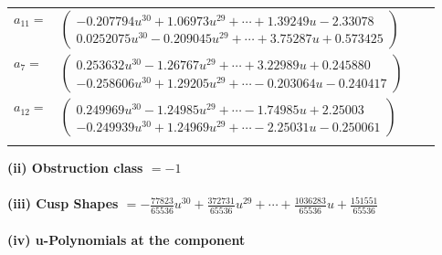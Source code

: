 \documentclass[1p]{elsarticle_modified}
\theoremstyle{definition}
\begin{document}
\begin{tabular}{m{7pt} m{180pt} m{7pt} m{180pt} }
\flushright $a_{11}=$&$\begin{pmatrix}-0.207794 u^{30}+1.06973 u^{29}+\cdots+1.39249 u-2.33078\\0.0252075 u^{30}-0.209045 u^{29}+\cdots+3.75287 u+0.573425\end{pmatrix}$ \\
\flushright $a_{7}=$&$\begin{pmatrix}0.253632 u^{30}-1.26767 u^{29}+\cdots+3.22989 u+0.245880\\-0.258606 u^{30}+1.29205 u^{29}+\cdots-0.203064 u-0.240417\end{pmatrix}$ \\
\flushright $a_{12}=$&$\begin{pmatrix}0.249969 u^{30}-1.24985 u^{29}+\cdots-1.74985 u+2.25003\\-0.249939 u^{30}+1.24969 u^{29}+\cdots-2.25031 u-0.250061\end{pmatrix}$\\&\end{tabular}
\flushleft \textbf{(ii) Obstruction class $= -1$}\\~\\
\flushleft \textbf{(iii) Cusp Shapes $= -\frac{77823}{65536} u^{30}+\frac{372731}{65536} u^{29}+\cdots+\frac{1036283}{65536} u+\frac{151551}{65536}$}\\~\\
\newpage\renewcommand{\arraystretch}{1}
\flushleft \textbf{(iv) u-Polynomials at the component}\newline \\
\end{document}

